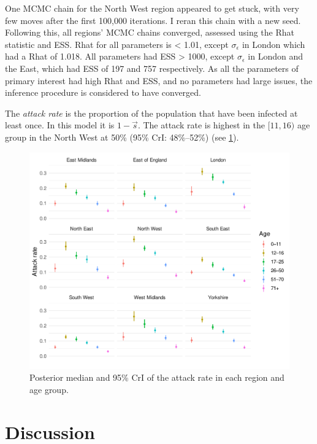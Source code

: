 \documentclass[thesis.tex]{subfiles}
\begin{document}
One MCMC chain for the North West region appeared to get stuck, with very few moves after the first 100,000 iterations.
I reran this chain with a new seed.
Following this, all regions' MCMC chains converged, assessed using the Rhat statistic and ESS.
Rhat for all parameters is < 1.01, except $\sigma_\epsilon$ in London which had a Rhat of 1.018.
All parameters had ESS > 1000, except $\sigma_\epsilon$ in London and the East, which had ESS of 197 and 757 respectively.
As all the parameters of primary interest had high Rhat and ESS, and no parameters had large issues, the inference procedure is considered to have converged.

The \emph{attack rate} is the proportion of the population that have been infected at least once.
In this model it is $1 - \vec{s}$.
The attack rate is highest in the $[11, 16)$ age group in the North West at 50\% (95\% CrI: 48\%--52\%) (see \cref{SEIR:fig:attack-rates}).
\begin{figure}
    \includegraphics{SEIR/CIS/attack_rates}
    \caption{Posterior median and 95\% CrI of the attack rate in each region and age group.}
    \label{SEIR:fig:attack-rates}
\end{figure}


\section{Discussion} \label{SEIR:sec:discussion}
\end{document}
